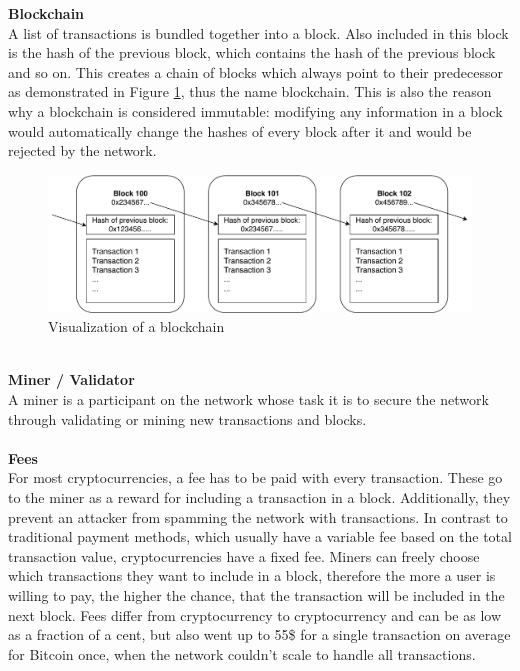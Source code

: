 \textbf{Blockchain}\\
A list of transactions is bundled together into a block.
Also included in this block is the hash of the previous block, which contains the hash of the previous block and so on.
This creates a chain of blocks\cite{bitcoin-whitepaper} which always point to their predecessor as demonstrated in Figure \ref{fig:blockchain}, thus the name blockchain.
This is also the reason why a blockchain is considered immutable: modifying any information in a block would automatically change the hashes of every block after it and would be rejected by the network.
\newpage
\begin{figure}[H]
    \includegraphics[width=\textwidth]{img/blockchain.pdf}
    \caption{Visualization of a blockchain}
    \label{fig:blockchain}
\end{figure}
\leavevmode
\\

\textbf{Miner / Validator}\\
A miner is a participant on the network whose task it is to secure the network through validating or mining new transactions and blocks.
\\\\

\textbf{Fees}\\
For most cryptocurrencies, a fee has to be paid with every transaction.
These go to the miner as a reward for including a transaction in a block.
Additionally, they prevent an attacker from spamming the network with transactions.
In contrast to traditional payment methods, which usually have a variable fee based on the total transaction value, cryptocurrencies have a fixed fee.
Miners can freely choose which transactions they want to include in a block, therefore the more a user is willing to pay, the higher the chance, that the transaction will be included in the next block.
Fees differ from cryptocurrency to cryptocurrency and can be as low as a fraction of a cent, but also went up to 55\$ for a single transaction on average\cite{btc-fees} for Bitcoin once, when the network couldn't scale to handle all transactions.
\\\\

